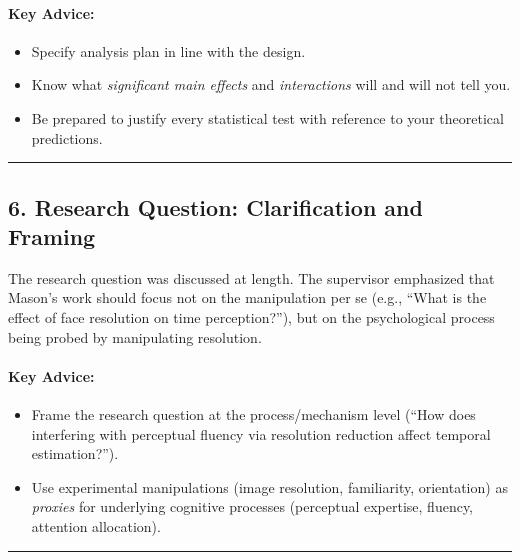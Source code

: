 \documentclass[
]{article}
\providecommand{\tightlist}{%
  \setlength{\itemsep}{0pt}\setlength{\parskip}{0pt}}
\begin{document}
\paragraph{\texorpdfstring{\textbf{Key
Advice:}}{Key Advice:}}\label{key-advice-5}

\begin{itemize}
\tightlist
\item
  Specify analysis plan in line with the design.
\item
  Know what \emph{significant main effects} and \emph{interactions} will
  and will not tell you.
\item
  Be prepared to justify every statistical test with reference to your
  theoretical predictions.
\end{itemize}

\begin{center}\rule{0.5\linewidth}{0.5pt}\end{center}

\subsection{6. Research Question: Clarification and
Framing}\label{research-question-clarification-and-framing}

The research question was discussed at length. The supervisor emphasized
that Mason's work should focus not on the manipulation per se (e.g.,
``What is the effect of face resolution on time perception?''), but on
the psychological process being probed by manipulating resolution.

\paragraph{\texorpdfstring{\textbf{Key
Advice:}}{Key Advice:}}\label{key-advice-6}

\begin{itemize}
\tightlist
\item
  Frame the research question at the process/mechanism level (``How does
  interfering with perceptual fluency via resolution reduction affect
  temporal estimation?'').
\item
  Use experimental manipulations (image resolution, familiarity,
  orientation) as \emph{proxies} for underlying cognitive processes
  (perceptual expertise, fluency, attention allocation).
\end{itemize}

\begin{center}\rule{0.5\linewidth}{0.5pt}\end{center}
\end{document}
